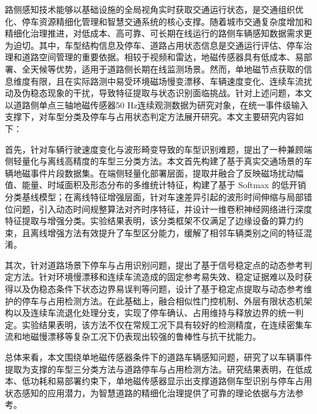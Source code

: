 路侧感知技术能够以基础设施的全局视角实时获取交通运行状态，是交通组织优化、停车资源精细化管理和智慧交通系统的核心支撑。随着城市交通复杂度增加和精细化治理推进，对低成本、高可靠、可长期在线运行的路侧车辆感知数据需求更为迫切。其中，车型结构信息及停车、道路占用状态信息是交通运行评估、停车治理和道路空间管理的重要依据。相较于视频和雷达，地磁传感器具有低成本、易部署、全天候等优势，适用于道路侧长期在线监测场景。然而，单地磁节点获取的信息维度有限，且在实际路测中易受环境磁场慢变漂移、车辆速度变化、连续车流扰动及伪稳态现象的干扰，导致特征提取与状态识别面临挑战。针对上述问题，本文以道路侧单点三轴地磁传感器50 Hz连续观测数据为研究对象，在统一事件级输入支撑下，对车型分类及停车与占用状态判定方法展开研究。本文主要研究内容如下：

首先，针对车辆行驶速度变化与波形畸变导致的车型识别难题，提出了一种兼顾端侧轻量化与离线高精度的车型三分类方法。本文首先构建了基于真实交通场景的车辆地磁事件片段数据集。在端侧轻量化部署层面，提取并融合了反映磁场扰动幅值、能量、时域面积及形态分布的多维统计特征，构建了基于 Softmax 的低开销分类基线模型；在离线特征增强层面，针对车速差异引起的波形时间伸缩与局部错位问题，引入动态时间规整算法对齐时序特征，并设计一维卷积神经网络进行深度特征提取与增强分类。实验结果表明，该分类框架不仅满足了边缘设备的算力约束，且离线增强方法有效提升了车型区分能力，缓解了相邻车辆类别之间的特征混淆。

其次，针对道路场景下停车与占用识别问题，提出了基于信号稳定点的动态参考判定方法。针对环境慢漂移和连续车流造成的固定参考易失效、稳定证据难以及时获得以及伪稳态条件下状态边界易误判等问题，设计了基于稳定点提取与动态参考维护的停车与占用检测方法。在此基础上，融合相似性门控机制、外层有限状态机架构以及连续车流退化处理分支，实现了停车确认、占用维持与释放边界的统一判定。实验结果表明，该方法不仅在常规工况下具有较好的检测精度，在连续密集车流和地磁慢漂移等复杂工况下仍表现出较强的鲁棒性与抗干扰能力。

总体来看，本文围绕单地磁传感器条件下的道路车辆感知问题，研究了以车辆事件提取为支撑的车型三分类方法与道路停车与占用检测方法。研究结果表明，在低成本、低功耗和易部署约束下，单地磁传感器显示出支撑道路侧车型识别与停车占用状态感知的应用潜力，为智慧道路的精细化治理提供了可靠的理论依据与方法参考。
